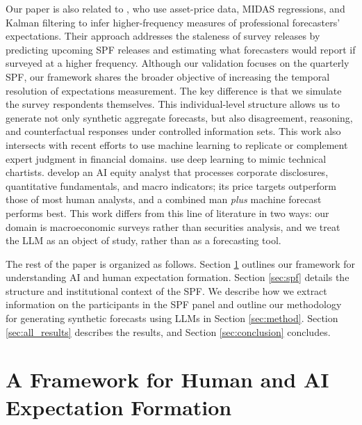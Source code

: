 \documentclass[11pt,letterpaper]{scrartcl}
\begin{document}
Our paper is also related to \citet{ghysels2009forecasting}, who use asset-price data, MIDAS regressions, and Kalman filtering to infer higher-frequency measures of professional forecasters’ expectations. Their approach addresses the staleness of survey releases by predicting upcoming SPF releases and estimating what forecasters would report if surveyed at a higher frequency. Although our validation focuses on the quarterly SPF, our framework shares the broader objective of increasing the temporal resolution of expectations measurement. The key difference is that we simulate the survey respondents themselves. This individual-level structure allows us to generate not only synthetic aggregate forecasts, but also disagreement, reasoning, and counterfactual responses under controlled information sets.
This work also intersects with recent efforts to use machine learning to replicate or complement expert judgment in financial domains. \cite{murray2024charting} use deep learning to mimic technical chartists. \cite{cao2024man} develop an AI equity analyst that processes corporate disclosures, quantitative fundamentals, and macro indicators; its price targets outperform those of most human analysts, and a combined man \emph{plus} machine forecast performs best. This work differs from this line of literature in two ways: our domain is macroeconomic surveys rather than securities analysis, and we treat the LLM as an object of study, rather than as a forecasting tool.

The rest of the paper is organized as follows. Section \ref{sec:framework} outlines our framework for understanding AI and human expectation formation. Section \ref{sec:spf} details the structure and institutional context of the SPF. We describe how we extract information on the participants in the SPF panel and outline our methodology for generating synthetic forecasts using LLMs in Section \ref{sec:method}. Section \ref{sec:all_results} describes the results, and Section \ref{sec:conclusion} concludes.

\section{A Framework for Human and AI Expectation Formation}\label{sec:framework}
\end{document}
